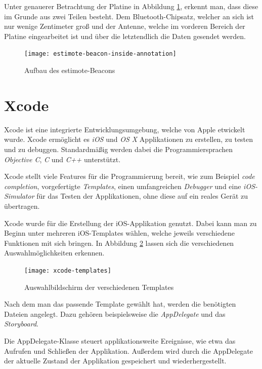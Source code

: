 Unter genauerer Betrachtung der Platine in Abbildung \ref{estimote-beacon-inside-annotations}, erkennt man, dass diese im Grunde aus zwei Teilen besteht.
Dem Bluetooth-Chipsatz, welcher an sich ist nur wenige Zentimeter groß und der Antenne, welche im vorderen Bereich der Platine eingearbeitet ist und über die letztendlich die Daten gesendet werden.

\begin{figure}[h!]
	\centering
	\texttt{[image: estimote-beacon-inside-annotation]}
	\caption{Aufbau des estimote-Beacons}
	\label{estimote-beacon-inside-annotations}
\end{figure}



\section{Xcode}
\label{sec:tools:xcode}
Xcode ist eine integrierte Entwicklungsumgebung, welche von Apple etwickelt wurde. Xcode ermöglicht es \emph{iOS} und \emph{OS X} Applikationen zu erstellen, zu testen und zu debuggen.
Standardmäßig werden dabei die Programmiersprachen \emph{Objective C}, \emph{C} und \emph{C++} unterstützt.

Xcode stellt viele Features für die Programmierung bereit, wie zum Beispiel \emph{code completion}, vorgefertigte \emph{Templates}, einen umfangreichen \emph{Debugger} und eine \emph{iOS-Simulator} für das Testen der Applikationen, ohne diese auf ein reales Gerät zu übertragen.

Xcode wurde für die Erstellung der iOS-Applikation genutzt.
Dabei kann man zu Beginn unter mehreren iOS-Templates wählen, welche jeweils verschiedene Funktionen mit sich bringen. In Abbildung \ref{xcode-templates} lassen sich die verschiedenen Auswahlmöglichkeiten erkennen.

\begin{figure}[htb!]
		\centering
	\texttt{[image: xcode-templates]}
	\caption{Auswahlbildschirm der verschiedenen Templates}
	\label{xcode-templates}
\end{figure}

Nach dem man das passende Template gewählt hat, werden die benötigten Dateien angelegt.
Dazu gehören beispielsweise die \emph{AppDelegate} und das \emph{Storyboard}.

Die AppDelegate-Klasse steuert applikationsweite Ereignisse, wie etwa das Aufrufen und Schließen der Applikation. Außerdem wird durch die AppDelegate der aktuelle Zustand der Applikation gespeichert und wiederhergestellt.

